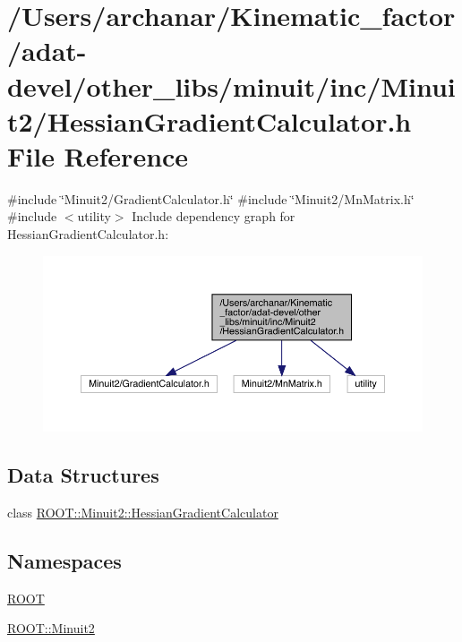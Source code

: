 \hypertarget{adat-devel_2other__libs_2minuit_2inc_2Minuit2_2HessianGradientCalculator_8h}{}\section{/\+Users/archanar/\+Kinematic\+\_\+factor/adat-\/devel/other\+\_\+libs/minuit/inc/\+Minuit2/\+Hessian\+Gradient\+Calculator.h File Reference}
\label{adat-devel_2other__libs_2minuit_2inc_2Minuit2_2HessianGradientCalculator_8h}
{\ttfamily \#include \char`\"{}Minuit2/\+Gradient\+Calculator.\+h\char`\"{}}\newline
{\ttfamily \#include \char`\"{}Minuit2/\+Mn\+Matrix.\+h\char`\"{}}\newline
{\ttfamily \#include $<$utility$>$}\newline
Include dependency graph for Hessian\+Gradient\+Calculator.\+h\+:
\nopagebreak
\begin{figure}[H]
\begin{center}
\leavevmode
\includegraphics[width=350pt]{d1/d50/adat-devel_2other__libs_2minuit_2inc_2Minuit2_2HessianGradientCalculator_8h__incl}
\end{center}
\end{figure}
\subsection*{Data Structures}
\begin{DoxyCompactItemize}
\item 
class \mbox{\hyperlink{classROOT_1_1Minuit2_1_1HessianGradientCalculator}{R\+O\+O\+T\+::\+Minuit2\+::\+Hessian\+Gradient\+Calculator}}
\end{DoxyCompactItemize}
\subsection*{Namespaces}
\begin{DoxyCompactItemize}
\item 
 \mbox{\hyperlink{namespaceROOT}{R\+O\+OT}}
\item 
 \mbox{\hyperlink{namespaceROOT_1_1Minuit2}{R\+O\+O\+T\+::\+Minuit2}}
\end{DoxyCompactItemize}
